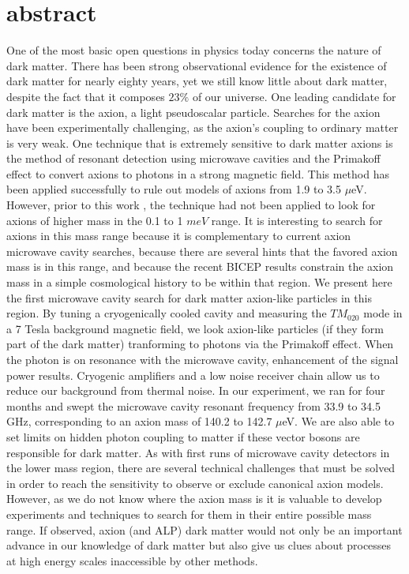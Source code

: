 \documentclass[12pt,twosides]{book}
\begin{document}
\section{abstract}

One of the most basic open questions in physics today concerns the nature of dark matter. There has been strong observational evidence for the existence of dark matter for nearly eighty years, yet we still know little about dark matter, despite the fact that it composes $23\%$ of our universe. One leading candidate for dark matter is the axion, a light pseudoscalar particle. Searches for the axion have been experimentally challenging, as the axion's coupling to ordinary matter is very weak. One technique that is extremely sensitive to dark matter axions is the method of resonant detection using microwave cavities and the Primakoff effect to convert axions to photons in a strong magnetic field. This method has been applied successfully to rule out models of axions from 1.9 to 3.5 $\mu$eV. However, prior to this work , the technique had not been applied to look for axions of higher mass in the 0.1 to 1 $meV$ range. It is interesting to search for axions in this mass range because it is complementary to current axion microwave cavity searches, because there are several hints that the favored axion mass is in this range, and because the recent BICEP results constrain the axion mass in a simple cosmological history to be within that region. We present here the first microwave cavity search for dark matter axion-like particles in this region. By tuning a cryogenically cooled cavity and measuring the $TM_{020}$ mode in a 7 Tesla background magnetic field, we look axion-like particles (if they form part of the dark matter)  tranforming to photons via the Primakoff effect. When the photon is on resonance with the microwave cavity, enhancement of the signal power results. Cryogenic amplifiers and a low noise receiver chain allow us to reduce our background from thermal noise. In our experiment, we ran for four months and swept the microwave cavity resonant frequency from 33.9 to 34.5 GHz, corresponding to an axion mass of 140.2  to 142.7 $\mu$eV. We are also able to set limits on hidden photon coupling to matter if these vector bosons are responsible for dark matter. As with first runs of microwave cavity detectors in the lower mass region, there are several technical challenges that must be solved in order to reach the sensitivity to observe or exclude canonical axion models. However, as we do not know where the axion mass is it is valuable to develop experiments and techniques to search for them in their entire possible mass range. If observed, axion (and ALP) dark matter would not only be an important advance in our knowledge of dark matter but also give us clues about processes at high energy scales inaccessible by other methods.
\end{document}
